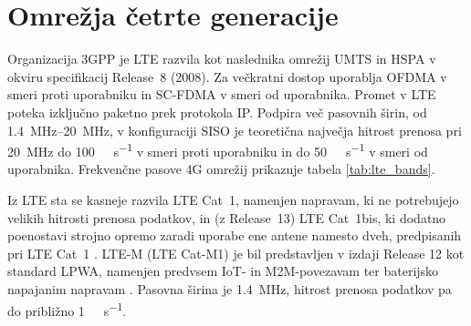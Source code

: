 \documentclass[a4paper,twoside,openright,12pt,slovene]{book}
\begin{document}
\section{Omrežja četrte generacije} \label{sec:4g}
    Organizacija 3GPP je LTE razvila kot naslednika omrežij UMTS in HSPA v okviru specifikacij Release~8 (2008). Za večkratni dostop uporablja OFDMA v smeri proti uporabniku in SC-FDMA v smeri od uporabnika. Promet v LTE poteka izključno paketno prek protokola IP. Podpira več pasovnih širin, od \SIrange{1,4}{20}{\mega\hertz}, v konfiguraciji SISO je teoretična največja hitrost prenosa pri \SI{20}{\mega\hertz} do \SI{100}{\mega\bit\per\second} v smeri proti uporabniku in do \SI{50}{\mega\bit\per\second} v smeri od uporabnika. Frekvenčne pasove 4G omrežij prikazuje tabela \ref{tab:lte_bands}.

    Iz LTE sta se kasneje razvila LTE Cat~1, namenjen napravam, ki ne potrebujejo velikih hitrosti prenosa podatkov, in (z Release~13) LTE Cat~1bis, ki dodatno poenostavi strojno opremo zaradi uporabe ene antene namesto dveh, predpisanih pri LTE Cat~1 \cite{ETSI_TS_136_306_V13.5}. LTE-M (LTE Cat-M1) je bil predstavljen v izdaji Release 12 kot standard LPWA, namenjen predvsem IoT- in M2M-povezavam ter baterijsko napajanim napravam \cite{LTE-M}. Pasovna širina je \SI{1,4}{\mega\hertz}, hitrost prenosa podatkov pa do približno \SI{1}{\mega\bit\per\second}.
\end{document}
